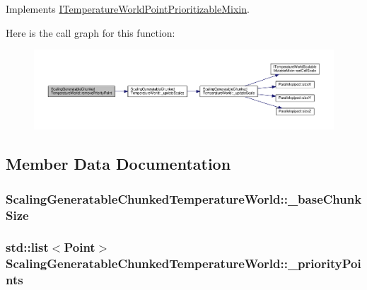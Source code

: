 Implements \hyperlink{class_i_temperature_world_point_prioritizable_mixin_afec8d32f30e7032061e4265c2bcffae5}{I\-Temperature\-World\-Point\-Prioritizable\-Mixin}.



Here is the call graph for this function\-:
\nopagebreak
\begin{figure}[H]
\begin{center}
\leavevmode
\includegraphics[width=350pt]{class_scaling_generatable_chunked_temperature_world_aff6258637594e1b5b0e25ba628d22b20_cgraph}
\end{center}
\end{figure}




\subsection{Member Data Documentation}
\hypertarget{class_scaling_generatable_chunked_temperature_world_aed44afc3904f0ee4317a6acaad217049}{
\subsubsection[{\-\_\-base\-Chunk\-Size}]{ Scaling\-Generatable\-Chunked\-Temperature\-World\-::\-\_\-base\-Chunk\-Size\hspace{0.3cm}{\ttfamily [protected]}}}\label{class_scaling_generatable_chunked_temperature_world_aed44afc3904f0ee4317a6acaad217049}
\hypertarget{class_scaling_generatable_chunked_temperature_world_a4f47190e0467638a518f350eb1a3292f}{
\subsubsection[{\-\_\-priority\-Points}]{\setlength{\rightskip}{0pt plus 5cm}std\-::list$<${\bf Point}$>$ Scaling\-Generatable\-Chunked\-Temperature\-World\-::\-\_\-priority\-Points\hspace{0.3cm}{\ttfamily [protected]}}}\label{class_scaling_generatable_chunked_temperature_world_a4f47190e0467638a518f350eb1a3292f}


